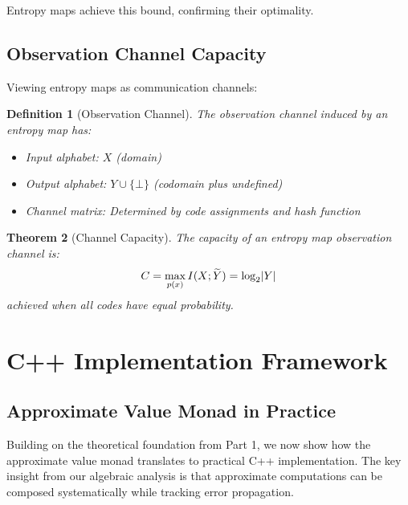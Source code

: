 \documentclass[11pt,final,hidelinks]{article}
\newtheorem{theorem}{Theorem}[section]
\newtheorem{definition}[theorem]{Definition}
\begin{document}
Entropy maps achieve this bound, confirming their optimality.

\subsection{Observation Channel Capacity}

Viewing entropy maps as communication channels:

\begin{definition}[Observation Channel]
The observation channel induced by an entropy map has:
\begin{itemize}
    \item Input alphabet: $X$ (domain)
    \item Output alphabet: $Y \cup \{\bot\}$ (codomain plus undefined)
    \item Channel matrix: Determined by code assignments and hash function
\end{itemize}
\end{definition}

\begin{theorem}[Channel Capacity]
The capacity of an entropy map observation channel is:
\begin{equation}
C = \max_{p(x)} I(X; \widetilde{Y}) = \log_2 \lvert Y\rvert
\end{equation}
achieved when all codes have equal probability.
\end{theorem}

\section{C++ Implementation Framework}

\subsection{Approximate Value Monad in Practice}

Building on the theoretical foundation from Part 1, we now show how the approximate value monad translates to practical C++ implementation. The key insight from our algebraic analysis is that approximate computations can be composed systematically while tracking error propagation.
\end{document}
